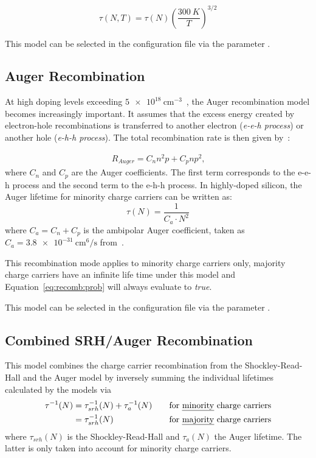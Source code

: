 \begin{equation}
    \tau(N, T) = \tau(N) \left( \frac{\SI{300}{K}}{T} \right)^{3/2}
\end{equation}

This model can be selected in the configuration file via the parameter .

\subsection{Auger Recombination}

At high doping levels exceeding $\SI{5e18}{\centi\metre^{-3}}$~\cite{fossum-lee}, the Auger recombination model becomes increasingly important.
It assumes that the excess energy created by electron-hole recombinations is transferred to another electron (\textit{e-e-h process}) or another hole (\textit{e-h-h process}).
The total recombination rate is then given by~\cite{kerr}:

\begin{align*}
	R_{Auger} = C_n n^2p + C_p n p^2\textrm{,}
\end{align*}
where $C_n$ and $C_p$ are the Auger coefficients.
The first term corresponds to the e-e-h process and the second term to the e-h-h process.
In highly-doped silicon, the Auger lifetime for minority charge carriers can be written as:
\begin{equation}
    \tau(N) = \frac{1}{C_{a} \cdot N^2}
\end{equation}
where $C_{a} = C_{n} + C_{p}$ is the ambipolar Auger coefficient, taken as $C_{a} = \SI{3.8e-31}{\cm^6 \per \s}$ from~\cite{dziewior}.

This recombination mode applies to minority charge carriers only, majority charge carriers have an infinite life time under this model and Equation~\eqref{eq:recomb:prob} will always evaluate to \emph{true}.

This model can be selected in the configuration file via the parameter .

\subsection{Combined SRH/Auger Recombination}

This model combines the charge carrier recombination from the Shockley-Read-Hall and the Auger model by inversely summing the individual lifetimes calculated by the models via
\begin{align}
    \label{eq:recom:combined}
    \tau^{-1}(N) &= \tau_{srh}^{-1}(N) + \tau_{a}^{-1}(N) &\quad \textrm{for \emph{minority} charge carriers} \nonumber \\
              &= \tau_{srh}^{-1}(N) &\quad \textrm{for \emph{majority} charge carriers}
\end{align}
where $\tau_{srh}(N)$ is the Shockley-Read-Hall and $\tau_{a}(N)$ the Auger lifetime.
The latter is only taken into account for minority charge carriers.

